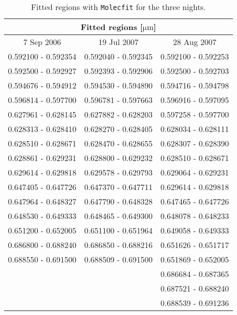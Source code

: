 \documentclass{aa}
\begin{document}
\begin{appendix}
\begin{table}[h]
\centering
\caption{Fitted regions with \texttt{Molecfit} for the three nights.}
\begin{tabular}{ccc}
\hline
\multicolumn{3}{c}{Fitted regions [$\mathrm{\mu m}$]} \\
\hline
7 Sep 2006 & 19 Jul 2007 & 28 Aug 2007 \\
\hline
0.592100 - 0.592354 & 0.592040 - 0.592345 & 0.592100 - 0.592253 \\
0.592500 - 0.592927 & 0.592393 - 0.592906 & 0.592500 - 0.592703 \\
0.594676 - 0.594912 & 0.594530 - 0.594890 & 0.594716 - 0.594798 \\
0.596814 - 0.597700 & 0.596781 - 0.597663 & 0.596916 - 0.597095 \\
0.627961 - 0.628145 & 0.627882 - 0.628203 & 0.597258 - 0.597700 \\
0.628313 - 0.628410 & 0.628270 - 0.628405 & 0.628034 - 0.628111 \\
0.628510 - 0.628671 & 0.628470 - 0.628655 & 0.628307 - 0.628390 \\
0.628861 - 0.629231 & 0.628800 - 0.629232 & 0.628510 - 0.628671 \\
0.629614 - 0.629818 & 0.629578 - 0.629793 & 0.629064 - 0.629231 \\
0.647405 - 0.647726 & 0.647370 - 0.647711 & 0.629614 - 0.629818 \\
0.647964 - 0.648327 & 0.647790 - 0.648328 & 0.647465 - 0.647726 \\
0.648530 - 0.649333 & 0.648465 - 0.649300 & 0.648078 - 0.648233 \\
0.651200 - 0.652005 & 0.651100 - 0.651964 & 0.649058 - 0.649333 \\
0.686800 - 0.688240 & 0.686850 - 0.688216 & 0.651626 - 0.651717 \\
0.688550 - 0.691500 & 0.688509 - 0.691500 & 0.651869 - 0.652005 \\
                                  &                                   & 0.686684 - 0.687365 \\
                                  &                                   & 0.687521 - 0.688240 \\
                                  &                                   & 0.688539 - 0.691236 \\                                                       
\end{tabular}

\label{recap regions}
\end{table}


\end{appendix}
\end{document}
